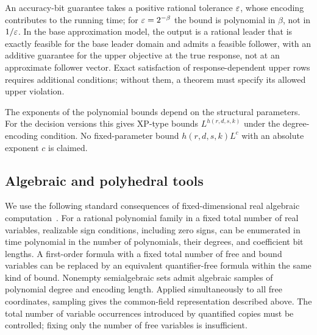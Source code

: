 An accuracy-bit guarantee takes a positive rational tolerance $\varepsilon$,
whose encoding contributes to the running time; for $\varepsilon=2^{-\beta}$ the
bound is polynomial in $\beta$, not in $1/\varepsilon$. In the base
approximation model, the output is a rational leader that is exactly
feasible for the base leader domain and admits a feasible follower, with
an additive guarantee for the upper objective at the true response, not
at an approximate follower vector. Exact satisfaction of
response-dependent upper rows requires additional conditions; without
them, a theorem must specify its allowed upper violation.

The exponents of the polynomial bounds depend on the structural
parameters. For the decision versions this gives XP-type bounds
$L^{h(r,d,s,k)}$ under the degree-encoding condition. No fixed-parameter
bound $h(r,d,s,k)L^c$ with an absolute exponent $c$ is claimed.

\subsection{Algebraic and polyhedral tools}\label{subsec:tools}

We use the following standard consequences of fixed-dimensional real
algebraic computation~\cite[Theorem 1.3.1 and Section 3.1.3]{BasuPollackRoy1996}.
For a rational polynomial family in a fixed total number of real
variables, realizable sign conditions, including zero signs, can be
enumerated in time polynomial in the number of polynomials, their degrees,
and coefficient bit lengths. A first-order formula with a fixed total
number of free and bound variables can be replaced by an equivalent
quantifier-free formula within the same kind of bound. Nonempty
semialgebraic sets admit algebraic samples of polynomial degree and
encoding length. Applied simultaneously to all free coordinates, sampling
gives the common-field representation described above. The total number
of variable occurrences introduced by quantified copies must be controlled;
fixing only the number of free variables is insufficient.

